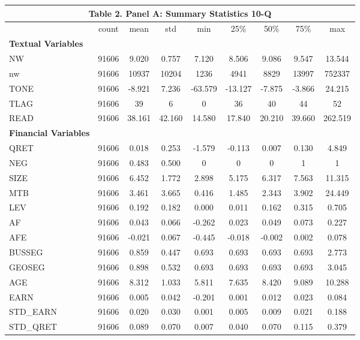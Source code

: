 \begin{table}[htbp] \label{T2PA}
  \centering
    \begin{tabular}{lcccccccc}
    \multicolumn{9}{c}{\textbf{Table 2. Panel A: Summary Statistics 10-Q}} \\
    \midrule
    \midrule
      & count & mean & std & min & 25\% & 50\% & 75\% & max \\
    \midrule
    \textbf{Textual Variables} &   &   &   &   &   &   &   &  \\
    NW & 91606 & 9.020 & 0.757 & 7.120 & 8.506 & 9.086 & 9.547 & 13.544 \\
    nw & 91606 & 10937 & 10204 & 1236 & 4941 & 8829 & 13997 & 752337 \\
    TONE & 91606 & -8.921 & 7.236 & -63.579 & -13.127 & -7.875 & -3.866 & 24.215 \\
    TLAG & 91606 & 39 & 6 & 0 & 36 & 40 & 44 & 52 \\
    READ & 91606 & 38.161 & 42.160 & 14.580 & 17.840 & 20.210 & 39.660 & 262.519 \\
    \textbf{Financial Variables} &   &   &   &   &   &   &   &  \\
    QRET & 91606 & 0.018 & 0.253 & -1.579 & -0.113 & 0.007 & 0.130 & 4.849 \\
    NEG & 91606 & 0.483 & 0.500 & 0 & 0 & 0 & 1 & 1 \\
    SIZE & 91606 & 6.452 & 1.772 & 2.898 & 5.175 & 6.317 & 7.563 & 11.315 \\
    MTB & 91606 & 3.461 & 3.665 & 0.416 & 1.485 & 2.343 & 3.902 & 24.449 \\
    LEV & 91606 & 0.192 & 0.182 & 0.000 & 0.011 & 0.162 & 0.315 & 0.705 \\
    AF & 91606 & 0.043 & 0.066 & -0.262 & 0.023 & 0.049 & 0.073 & 0.227 \\
    AFE & 91606 & -0.021 & 0.067 & -0.445 & -0.018 & -0.002 & 0.002 & 0.078 \\
    BUSSEG & 91606 & 0.859 & 0.447 & 0.693 & 0.693 & 0.693 & 0.693 & 2.773 \\
    GEOSEG & 91606 & 0.898 & 0.532 & 0.693 & 0.693 & 0.693 & 0.693 & 3.045 \\
    AGE & 91606 & 8.312 & 1.033 & 5.811 & 7.635 & 8.420 & 9.089 & 10.288 \\
    EARN & 91606 & 0.005 & 0.042 & -0.201 & 0.001 & 0.012 & 0.023 & 0.084 \\
    STD\_EARN & 91606 & 0.020 & 0.030 & 0.001 & 0.005 & 0.009 & 0.021 & 0.188 \\
    STD\_QRET & 91606 & 0.089 & 0.070 & 0.007 & 0.040 & 0.070 & 0.115 & 0.379 \\
    \bottomrule
    \bottomrule
    \end{tabular}%
\end{table}%
